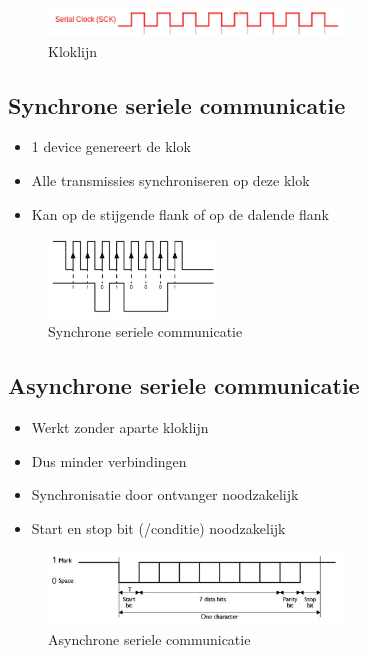 \documentclass{article}
\begin{document}
\begin{figure}[H]
    \centering
    \includegraphics[width=0.7\textwidth]{Screenshot_20200323_120525.png}
    \caption{Kloklijn}
\end{figure}

\subsection{Synchrone seriele communicatie}
\begin{itemize}
    \item 1 device genereert de klok
    \item Alle transmissies synchroniseren op deze klok
    \item Kan op de stijgende flank of op de dalende flank 
\end{itemize}

\begin{figure}[H]
    \centering
    \includegraphics[width=0.4\textwidth]{Screenshot_20200323_120955.png}
    \caption{Synchrone seriele communicatie}
\end{figure}


\subsection{Asynchrone seriele communicatie}
\begin{itemize}
    \item Werkt zonder aparte kloklijn
    \item Dus minder verbindingen
    \item Synchronisatie door ontvanger noodzakelijk
    \item Start en stop bit (/conditie) noodzakelijk
\end{itemize}


\begin{figure}[H]
    \centering
    \includegraphics[width=0.7\textwidth]{Screenshot_20200323_121104.png}
    \caption{Asynchrone seriele communicatie}
\end{figure}
\end{document}
